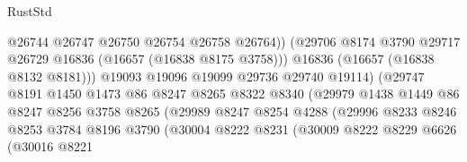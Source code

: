 \begin{lexlean}{RustStd}
\begin{coremodule}
                                        @26744
                                        @26747
                                        @26750
                                        @26754
                                        @26758
                                        @26764))
                                    (@29706
                                      @8174
                                      @3790
                                      @29717
                                      @26729
                                      @16836
                                      (@16657 (@16838 @8175 @3758)))
                                    @16836
                                    (@16657 (@16838 @8132 @8181)))
                                  @19093
                                  @19096
                                  @19099
                                  @29736
                                  @29740
                                  @19114)
                                (@29747
                                  @8191
                                  @1450
                                  @1473
                                  @86
                                  @8247
                                  @8265
                                  @8322
                                  @8340
                                  (@29979
                                    @1438
                                    @1449
                                    @86
                                    @8247
                                    @8256
                                    @3758
                                    @8265
                                    (@29989
                                      @8247
                                      @8254
                                      @4288
                                      (@29996
                                        @8233
                                        @8246
                                        @8253
                                        @3784
                                        @8196
                                        @3790
                                        (@30004
                                          @8222
                                          @8231
                                          (@30009
                                            @8222
                                            @8229
                                            @6626
                                            (@30016
                                              @8221

\end{coremodule}
\end{lexlean}

